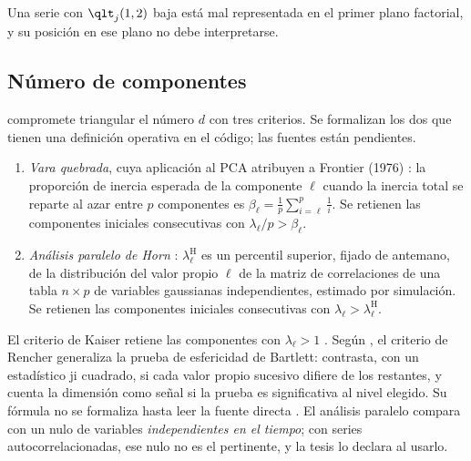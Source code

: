 Una serie con $\qlt_j(1,2)$ baja está mal representada en el primer plano factorial, y su
posición en ese plano no debe interpretarse.

\subsection{Número de componentes}
\label{sec:retencion}

 compromete triangular el número $d$ con tres criterios. Se formalizan los dos
que tienen una definición operativa en el código; las fuentes están pendientes.

\begin{definicion}\label{def:retencion}
\begin{enumerate}[label=(\alph*)]
  \item \emph{Vara quebrada}, cuya aplicación al PCA \textcite{camiz_pillar_2018} atribuyen a
    Frontier (1976) : la
    proporción de inercia esperada de la componente $\ell$ cuando la inercia total se reparte al
    azar entre $p$ componentes es $\beta_\ell=\frac1p\sum_{i=\ell}^{p}\frac1i$. Se retienen las
    componentes iniciales consecutivas con $\lambda_\ell/p>\beta_\ell$.
  \item \emph{Análisis paralelo de Horn} \parencite{horn_1965}: $\lambda^{\mathrm
    H}_\ell$ es un percentil superior, fijado de antemano, de la distribución del valor propio
    $\ell$ de la matriz de correlaciones de una tabla $n\times p$ de variables gaussianas
    independientes, estimado por simulación. Se retienen las componentes iniciales consecutivas
    con $\lambda_\ell>\lambda^{\mathrm H}_\ell$.
\end{enumerate}
\end{definicion}

El criterio de Kaiser retiene las componentes con $\lambda_\ell>1$
\parencite{kaiser_1960}. Según \textcite{camiz_pillar_2018}, el criterio de Rencher generaliza la prueba de
esfericidad de Bartlett: contrasta, con un estadístico ji cuadrado, si cada valor propio sucesivo
difiere de los restantes, y cuenta la dimensión como señal si la prueba es significativa al nivel
elegido. Su fórmula no se formaliza hasta leer la fuente directa
\parencite{rencher_christensen_2012}. El
análisis paralelo compara con un nulo
de variables \emph{independientes en el tiempo}; con series autocorrelacionadas, ese nulo no es el
pertinente, y la tesis lo declara al usarlo.

